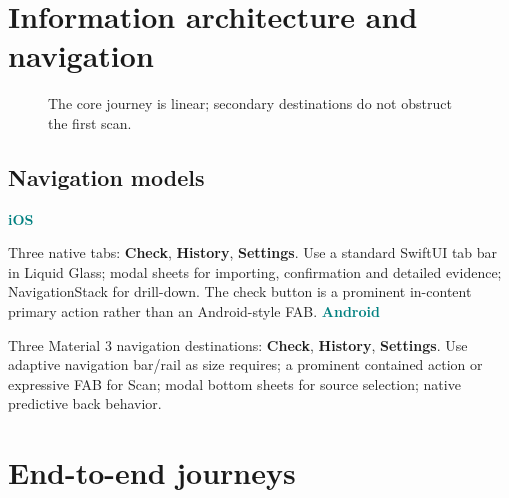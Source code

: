 \documentclass[10pt,a4paper]{article}
\newcommand{\platform}[1]{\vspace{1mm}\textcolor{teal}{\bfseries #1}\par}
\begin{document}
\section{Information architecture and navigation}
\begin{figure}[h!]
\centering
{}
\caption{The core journey is linear; secondary destinations do not obstruct the first scan.}
\end{figure}

\subsection{Navigation models}
\platform{iOS}
Three native tabs: \textbf{Check}, \textbf{History}, \textbf{Settings}. Use a standard SwiftUI tab bar in Liquid Glass; modal sheets for importing, confirmation and detailed evidence; NavigationStack for drill-down. The check button is a prominent in-content primary action rather than an Android-style FAB.
\platform{Android}
Three Material 3 navigation destinations: \textbf{Check}, \textbf{History}, \textbf{Settings}. Use adaptive navigation bar/rail as size requires; a prominent contained action or expressive FAB for Scan; modal bottom sheets for source selection; native predictive back behavior.

\section{End-to-end journeys}
\end{document}
